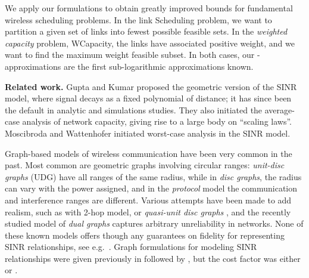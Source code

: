 \documentclass[11pt]{article}
\newcommand{\mypara}[1]{\smallskip\noindent\textbf{#1.}}  \newcommand{\tightpara}[1]{\noindent\textbf{#1.}}
\newcommand{\wcapacity}{\textsf{WCapacity}}
\newcommand{\scheduling}{\textsf{Scheduling}}
\begin{document}
We apply our formulations to obtain greatly improved bounds for fundamental wireless scheduling problems.
In the link {\scheduling} problem, we want to partition a given set of links into fewest possible feasible
sets. In the \emph{weighted capacity} problem, {\wcapacity}, the links have associated positive weight, and 
we want to find the maximum weight feasible subset. In both cases, our -approximations 
are the first sub-logarithmic approximations known. 

\mypara{Related work}
Gupta and Kumar \cite{kumar00} proposed the geometric version of the SINR model, where signal decays as a fixed
polynomial of distance; it has since been the default in analytic and simulations studies.
They also initiated the average-case analysis of network capacity, giving rise to a large body on ``scaling laws''.
Moscibroda and Wattenhofer \cite{moscibrodaconnectivity} initiated worst-case analysis in the SINR model. 

Graph-based models of wireless communication have been very common in the past.
Most common are geometric graphs involving circular ranges: \emph{unit-disc graphs} (UDG) have all ranges of the same
radius, while in \emph{disc graphs}, the radius can vary with the power assigned, and in the \emph{protocol} model
\cite{kumar00} the communication and interference ranges are different.  Various attempts have been made to add realism,
such as with 2-hop model, or \emph{quasi-unit disc graphs} \cite{barriere2003robust,kuhn2003ad}, and the recently
studied model of \emph{dual graphs} \cite{kuhn2010broadcasting} captures arbitrary unreliability in networks.  None of
these known models offers though any guarantees on fidelity for representing SINR relationships, see e.g.\
\cite{moscibeyondgraphs}.  Graph formulations for modeling SINR relationships were given previously in \cite{us:talg12}
followed by \cite{tonoyanmeancapacity}, but the cost factor was either  or .
\end{document}
